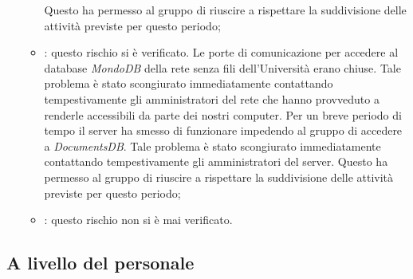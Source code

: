 \begin{itemize}
\begin{itemize}
				Questo ha permesso al gruppo di riuscire a rispettare la suddivisione delle attività previste per questo periodo;
				\item \textbf{\CO}: questo rischio si è verificato. Le porte di comunicazione per accedere al database \textit{MondoDB} della rete senza fili dell'Università erano chiuse. Tale problema è stato scongiurato immediatamente contattando tempestivamente gli amministratori del rete che hanno provveduto a renderle accessibili da parte dei nostri computer.  
				Per un breve periodo di tempo il server ha smesso di funzionare impedendo al gruppo di accedere a \textit{DocumentsDB}. Tale problema è stato scongiurato immediatamente contattando tempestivamente gli amministratori del server. 
				Questo ha permesso al gruppo di riuscire a rispettare la suddivisione delle attività previste per questo periodo;
				\item \textbf{\VV}: questo rischio non si è mai verificato. 
			\end{itemize}
		\end{itemize}	
	
	\subsection{A livello del personale}
	
